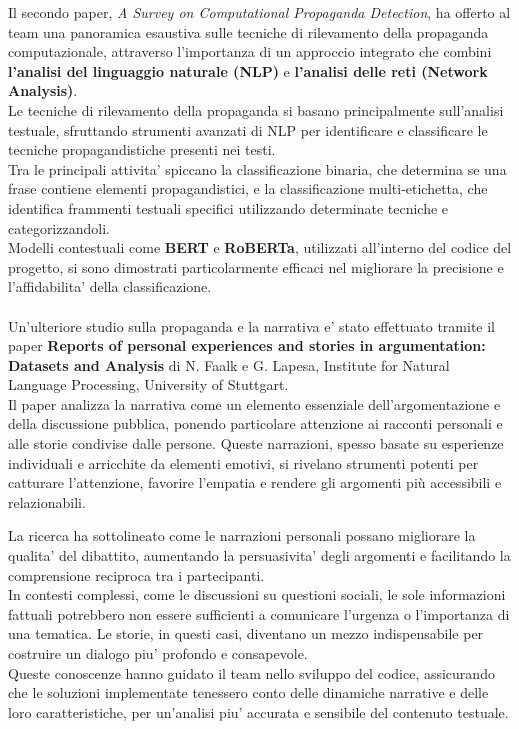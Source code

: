 \documentclass{article}
\begin{document}
\newpage
Il secondo paper, \textit{A Survey on Computational Propaganda Detection}, ha offerto al team una panoramica  esaustiva sulle tecniche di rilevamento della propaganda computazionale, attraverso l'importanza di un approccio integrato che combini \textbf{l'analisi del linguaggio naturale (NLP)} e \textbf{l'analisi delle reti (Network Analysis)}.\\
Le tecniche di rilevamento della propaganda si basano principalmente sull'analisi testuale, sfruttando strumenti avanzati di NLP per identificare e classificare le tecniche propagandistiche presenti nei testi.\\ Tra le principali attivita' spiccano la classificazione binaria, che determina se una frase contiene elementi propagandistici, e la classificazione multi-etichetta, che identifica frammenti testuali specifici utilizzando determinate tecniche e categorizzandoli. \\ Modelli contestuali come \textbf{BERT} e \textbf{RoBERTa}, utilizzati all'interno del codice del progetto, si sono dimostrati particolarmente efficaci nel migliorare la precisione e l'affidabilita' della classificazione.\\
\\
Un'ulteriore studio sulla propaganda e la narrativa e' stato effettuato tramite il paper \textbf{Reports of personal experiences and stories in argumentation: Datasets and Analysis} di N. Faalk e G. Lapesa, Institute for Natural Language Processing, University of Stuttgart.\\
Il paper analizza la narrativa come un elemento essenziale dell'argomentazione e della discussione pubblica, ponendo particolare attenzione ai racconti personali e alle storie condivise dalle persone. Queste narrazioni, spesso basate su esperienze individuali e arricchite da elementi emotivi, si rivelano strumenti potenti per catturare l'attenzione, favorire l'empatia e rendere gli argomenti più accessibili e relazionabili.\\

\newpage

La ricerca ha sottolineato come le narrazioni personali possano migliorare la qualita' del dibattito, aumentando la persuasivita' degli argomenti e facilitando la comprensione reciproca tra i partecipanti.\\ In contesti complessi, come le discussioni su questioni sociali, le sole informazioni fattuali potrebbero non essere sufficienti a comunicare l'urgenza o l'importanza di una tematica. Le storie, in questi casi, diventano un mezzo indispensabile per costruire un dialogo piu' profondo e consapevole.\\ 
Queste conoscenze hanno guidato il team nello sviluppo del codice, assicurando che le soluzioni implementate tenessero conto delle dinamiche narrative e delle loro caratteristiche, per un'analisi piu' accurata e sensibile del contenuto testuale.
\end{document}
